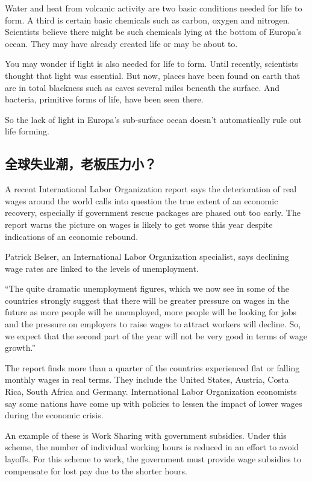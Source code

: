 Water and heat from volcanic activity are two basic
conditions needed for life to form. A third is certain basic
chemicals such as carbon, oxygen and nitrogen. Scientists
believe there might be such chemicals lying at the bottom
of Europa's ocean. They may have already created life or
may be about to.

You may wonder if light is also needed for life to form.
Until recently, scientists thought that light was essential.
But now, places have been found on earth that are in total
blackness such as caves several miles beneath the surface.
And bacteria, primitive forms of life, have been seen
there.

So the lack of light in Europa's sub-surface ocean doesn't
automatically rule out life forming.
\subsection{全球失业潮，老板压力小？}
A recent International Labor Organization report says
the deterioration of real wages around the world calls into
question the true extent of an economic recovery, especially
if government rescue packages are phased out too
early. The report warns the picture on wages is likely to
get worse this year despite indications of an economic rebound.

Patrick Belser, an International Labor Organization specialist,
says declining wage rates are linked to the levels of
unemployment.

“The quite dramatic unemployment figures, which we now
see in some of the countries strongly suggest that there will
be greater pressure on wages in the future as more people
will be unemployed, more people will be looking
for jobs and the pressure on employers to raise wages to
attract workers will decline. So, we expect that the second
part of the year will not be very good in terms of wage
growth.”

The report finds more than a quarter of the countries experienced
flat or falling monthly wages in real terms. They
include the United States, Austria, Costa Rica, South Africa
and Germany. International Labor Organization economists
say some nations have come up with policies to lessen
the impact of lower wages during the economic crisis.

An example of these is Work Sharing with government
subsidies. Under this scheme, the number of individual
working hours is reduced in an effort to avoid layoffs. For
this scheme to work, the government must provide wage
subsidies to compensate for lost pay due to the shorter
hours.
